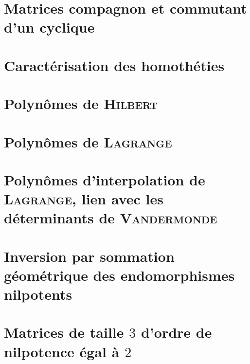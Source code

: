 \section{Matrices compagnon et commutant d'un cyclique}


\section{Caractérisation des homothéties}


\section{Polynômes de \textsc{Hilbert}} \label{polynome_hilbert}


\section{Polynômes de \textsc{Lagrange}} 


\section{Polynômes d'interpolation de \textsc{Lagrange}, lien avec les déterminants de \textsc{Vandermonde}}


\section{Inversion par sommation géométrique des endomorphismes nilpotents} 


\section{Matrices de taille $3$ d'ordre de nilpotence égal à $2$} 


